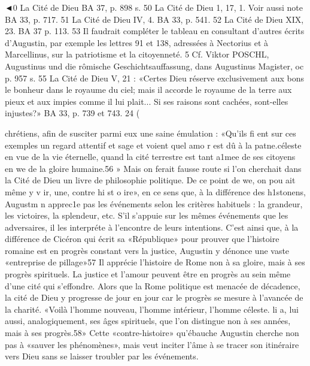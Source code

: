 ◄0 La Cité de Dieu BA 37, p. 898 s.
50 La Cité de Dieu 1, 17, 1. Voir aussi note BA 33, p. 717.
51 La Cité de Dieu IV, 4. BA 33, p. 541.
52 La Cité de Dieu XIX, 23. BA 37 p. 113.
53 Il faudrait compléter le tableau en consultant d'autres écrits d'Augustin, par exemple les lettres 91 et 138, adressées à Nectorius et à Marcellinus, sur la patriotisme et la citoyenneté.
5  Cf. Viktor POSCHL, Augustinus und die rômische Geschichtsauffassung, dans Augustinus Magister, oc p. 957 s.
55 La Cité de Dieu V, 21 : «Certes Dieu réserve exclusivement aux bons le bonheur dans le royaume du ciel; mais il accorde le royaume de la terre aux pieux et aux impies comme il lui plait... Si ses raisons sont cachées, sont-elles injustes?» BA 33, p. 739 et 743.
24	(
 
chrétiens, afin de susciter parmi eux une saine émulation : «Qu'ils fi ent sur ces exemples un regard attentif et sage et voient quel amo r est dû à la patne.céleste en vue de la vie éternelle, quand la cité terrestre est tant a1mee de ses citoyens en we de
la gloire humaine.56 »
Mais on ferait fausse route si l'on cherchait dans la Cité de Dieu un livre de philosophie politique. De ce point de we, on pou ait même y  v ir,  une, contre­ hi st o ire», en ce sens que, à la différence des h1stonens, Augustm n apprec1e pas les événements selon les critères habituels : la grandeur, les victoires, la splendeur, etc. S'il s'appuie sur les mêmes événements que les adversaires, il les interpréte à l'encontre de leurs intentions. C'est ainsi que, à la différence de Cicéron qui écrit sa
«République» pour prouver que l'histoire romaine est en progrès constant vers la justice, Augustin y dénonce une vaste «entreprise de pillage»57  Il apprécie l'histoire de Rome non à sa gloire, mais à ses progrès spirituels. La justice et l'amour peuvent être en progrès au sein même d'une cité qui s'effondre. Alors que la Rome politique est menacée de décadence, la cité de Dieu y progresse de jour en jour car le progrès se mesure à l'avancée de la charité. «Voilà l'homme nouveau, l'homme intérieur, l'homme céleste. li a, lui aussi, analogiquement, ses âges spirituels, que l'on distingue non à ses années, mais à ses progrès.58» Cette «contre-histoire» qu'ébauche Augustin cherche non pas à «sauver les phénomènes», mais veut inciter l'âme à se tracer son itinéraire vers Dieu sans se laisser troubler par les événements.

